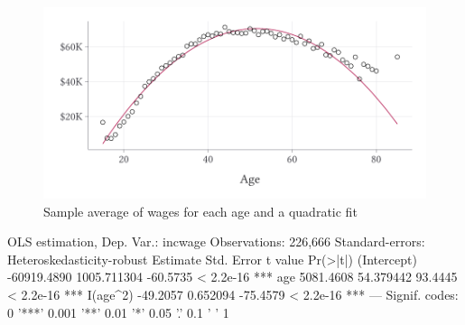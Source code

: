 \documentclass[12pt]{article}
\begin{document}
\begin{enumerate}
  \begin{figure}
    \caption{Sample average of wages for each age and a quadratic fit}
    \label{fig:wage_vs_age}
    \includegraphics[width = \linewidth]{figures/plot_wage_age.pdf}
  \end{figure}

  \bigskip
  \begin{codeblock}[{}]
OLS estimation, Dep. Var.: incwage
Observations: 226,666
Standard-errors: Heteroskedasticity-robust 
                Estimate  Std. Error  t value  Pr(>|t|)    
(Intercept) -60919.4890 1005.711304 -60.5735 < 2.2e-16 ***
age           5081.4608   54.379442  93.4445 < 2.2e-16 ***
I(age^2)       -49.2057    0.652094 -75.4579 < 2.2e-16 ***
---
Signif. codes:  0 '***' 0.001 '**' 0.01 '*' 0.05 '.' 0.1 ' ' 1
  \end{codeblock}


\end{enumerate}
\end{document}
